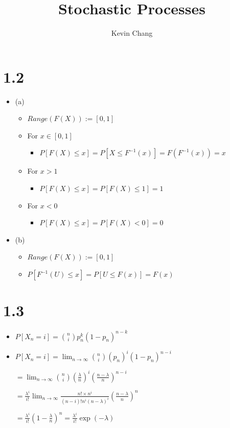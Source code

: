 \documentclass[a4paper]{article}
\title{Stochastic Processes}
\author{Kevin Chang}
\begin{document}
\maketitle

\section{1.2}
\begin{itemize}
    \item (a)
        \begin{itemize}
            \item $\mathit{Range}(F(X)) := [0, 1]$
            \item For $x \in [0, 1]$
                \begin{itemize}
                    \item $P[F(X) \leq x] = P[X \leq F^{-1}(x)] = F(F^{-1}(x)) = x$
                \end{itemize}
            \item For $x > 1$
                \begin{itemize}
                    \item $P[F(X) \leq x] = P[F(X) \leq 1] = 1$
                \end{itemize}
            \item For $x < 0$
                \begin{itemize}
                    \item $P[F(X) \leq x] = P[F(X) < 0] = 0$
                \end{itemize}
        \end{itemize}
    \item (b)
        \begin{itemize}
            \item $\mathit{Range}(F(X)) := [0, 1]$
            \item $P[F^{-1}(U) \leq x] = P[U \leq F(x)] = F(x)$
        \end{itemize}
\end{itemize}

\section{1.3}
\begin{itemize}
    \item $P[X_n = i] = \binom{n}{i} p_n^k (1 - p_n)^{n-k}$
    \item $P[X_n = i] = \lim_{n\rightarrow \infty} \binom{n}{i}(p_n)^i(1 - p_n)^{n-i}$

    $= \lim_{n\rightarrow \infty} \binom{n}{i}(\frac{\lambda}{n})^i(\frac{n-\lambda}{n})^{n-i}$

    $= \frac{\lambda^i}{i!}\lim_{n\rightarrow \infty} \frac{n! \times n^{i}}{(n-i)! n^i (n-\lambda)^i} (\frac{n-\lambda}{n})^n$

    $= \frac{\lambda^i}{i!}(1-\frac{\lambda}{n})^{n} = \frac{\lambda^i}{i!}\exp(-\lambda)$
\end{itemize}
\end{document}
